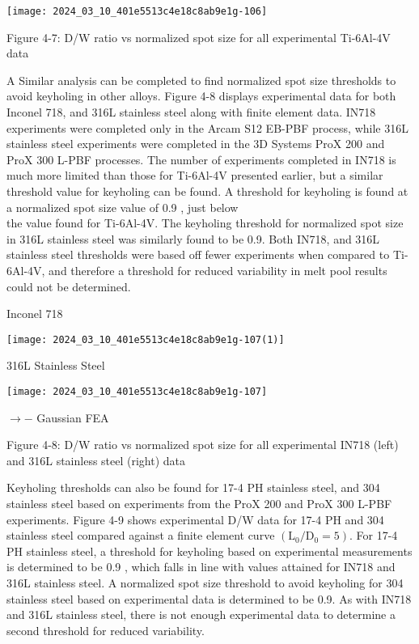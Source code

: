 \documentclass[10pt]{article}
\begin{document}
\begin{center}
\texttt{[image: 2024\_03\_10\_401e5513c4e18c8ab9e1g-106]}
\end{center}

Figure 4-7: D/W ratio vs normalized spot size for all experimental Ti-6Al-4V data

A Similar analysis can be completed to find normalized spot size thresholds to avoid keyholing in other alloys. Figure 4-8 displays experimental data for both Inconel 718, and 316L stainless steel along with finite element data. IN718 experiments were completed only in the Arcam S12 EB-PBF process, while 316L stainless steel experiments were completed in the 3D Systems ProX 200 and ProX 300 L-PBF processes. The number of experiments completed in IN718 is much more limited than those for Ti-6Al-4V presented earlier, but a similar threshold value for keyholing can be found. A threshold for keyholing is found at a normalized spot size value of 0.9 , just below\\
the value found for Ti-6Al-4V. The keyholing threshold for normalized spot size in 316L stainless steel was similarly found to be 0.9. Both IN718, and 316L stainless steel thresholds were based off fewer experiments when compared to Ti-6Al-4V, and therefore a threshold for reduced variability in melt pool results could not be determined.

Inconel 718

\begin{center}
\texttt{[image: 2024\_03\_10\_401e5513c4e18c8ab9e1g-107(1)]}
\end{center}

316L Stainless Steel

\begin{center}
\texttt{[image: 2024\_03\_10\_401e5513c4e18c8ab9e1g-107]}
\end{center}

$\rightarrow-$ Gaussian FEA

Figure 4-8: D/W ratio vs normalized spot size for all experimental IN718 (left) and 316L stainless steel (right) data

Keyholing thresholds can also be found for 17-4 PH stainless steel, and 304 stainless steel based on experiments from the ProX 200 and ProX 300 L-PBF experiments. Figure 4-9 shows experimental D/W data for 17-4 PH and 304 stainless steel compared against a finite element curve $\left(\mathrm{L}_{0} / \mathrm{D}_{0}=5\right)$. For 17-4 PH stainless steel, a threshold for keyholing based on experimental measurements is determined to be 0.9 , which falls in line with values attained for IN718 and 316L stainless steel. A normalized spot size threshold to avoid keyholing for 304 stainless steel based on experimental data is determined to be 0.9. As with IN718 and 316L stainless steel, there is not enough experimental data to determine a second threshold for reduced variability.
\end{document}
